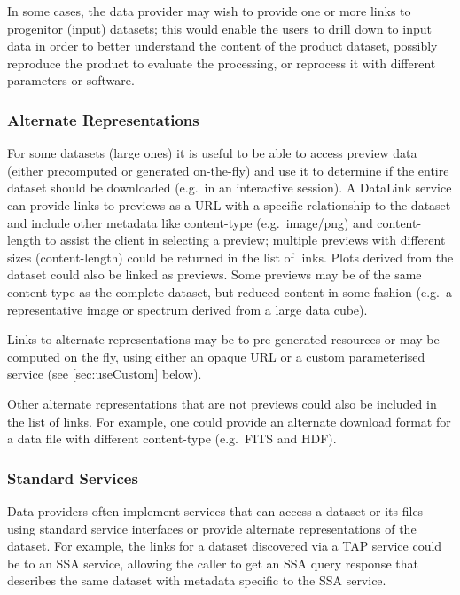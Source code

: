 \documentclass[11pt,a4paper]{ivoa}
\begin{document}
In some cases, the data provider may wish to provide one or more links to
progenitor (input) datasets; this would enable the users to drill down
to input data in order to better understand the content of the product
dataset, possibly reproduce the product to evaluate the processing,
or reprocess it with different parameters or software.


\subsubsection{Alternate Representations}

For some datasets (large ones) it is useful to be able to access
preview data (either precomputed or generated on-the-fly) and use it
to determine if the entire dataset should be downloaded (e.g.\ in an
interactive session). A DataLink service can provide links to previews
as a URL with a specific relationship to the dataset and include other
metadata like content-type (e.g.\ image/png) and content-length to assist
the client in selecting a preview; multiple previews with different sizes
(content-length) could be returned in the list of links. Plots derived
from the dataset could also be linked as previews. Some previews may be
of the same content-type as the complete dataset, but reduced content
in some fashion (e.g.\ a representative image or spectrum derived from
a large data cube).

Links to alternate representations may be to pre-generated resources
or may be computed on the fly, using either an opaque URL or a custom
parameterised service (see \ref{sec:useCustom} below).

Other alternate representations that are not previews could also
be included in the list of links. For example, one could provide an
alternate download format for a data file with different content-type
(e.g.\ FITS and HDF).


\subsubsection{Standard Services}
\label{sec:useStandard}

Data providers often implement services that can access a dataset
or its files using standard service interfaces or provide alternate
representations of the dataset. For example, the links for a dataset
discovered via a TAP service could be to an SSA service, allowing
the caller to get an SSA query response that describes the same dataset
with metadata specific to the SSA service.
\end{document}
